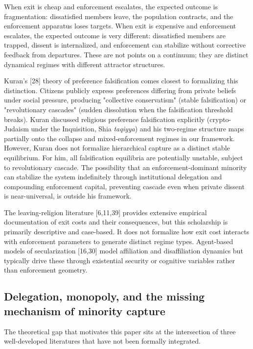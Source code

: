 \documentclass[12pt]{article}
\begin{document}
When exit is cheap and enforcement escalates, the expected outcome is fragmentation: dissatisfied members leave, the population contracts, and the enforcement apparatus loses targets. When exit is expensive and enforcement escalates, the expected outcome is very different: dissatisfied members are trapped, dissent is internalized, and enforcement can stabilize without corrective feedback from departures. These are not points on a continuum; they are distinct dynamical regimes with different attractor structures.

Kuran's [28] theory of preference falsification comes closest to formalizing this distinction. Citizens publicly express preferences differing from private beliefs under social pressure, producing "collective conservatism" (stable falsification) or "revolutionary cascades" (sudden dissolution when the falsification threshold breaks). Kuran discussed religious preference falsification explicitly (crypto-Judaism under the Inquisition, Shia \emph{taqiyya}) and his two-regime structure maps partially onto the collapse and mixed-enforcement regimes in our framework. However, Kuran does not formalize hierarchical capture as a distinct stable equilibrium. For him, all falsification equilibria are potentially unstable, subject to revolutionary cascade. The possibility that an enforcement-dominant minority can stabilize the system indefinitely through institutional delegation and compounding enforcement capital, preventing cascade even when private dissent is near-universal, is outside his framework.

The leaving-religion literature [6,11,39] provides extensive empirical documentation of exit costs and their consequences, but this scholarship is primarily descriptive and case-based. It does not formalize how exit cost interacts with enforcement parameters to generate distinct regime types. Agent-based models of secularization [16,30] model affiliation and disaffiliation dynamics but typically drive these through existential security or cognitive variables rather than enforcement geometry.

%
\subsection{Delegation, monopoly, and the missing mechanism of minority capture}

The theoretical gap that motivates this paper sits at the intersection of three well-developed literatures that have not been formally integrated.
\end{document}
